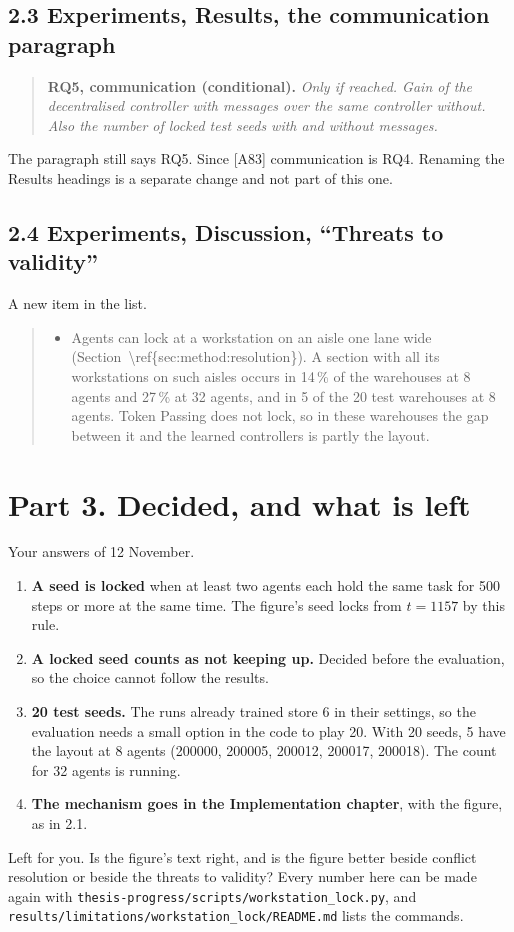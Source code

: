 \documentclass[11pt,a4paper]{article}
\newcommand{\new}[1]{\textcolor{newc}{#1}}
\newcommand{\mockup}[1]{\textit{#1}}
\begin{document}
\subsection*{2.3 Experiments, Results, the communication paragraph}
\begin{quote}
\textbf{RQ5, communication (conditional).} \mockup{Only if reached. Gain of
the decentralised controller with messages over the same controller without.}
\new{\mockup{Also the number of locked test seeds with and without
messages.}}
\end{quote}
The paragraph still says RQ5. Since [A83] communication is RQ4. Renaming the
Results headings is a separate change and not part of this one.

\subsection*{2.4 Experiments, Discussion, ``Threats to validity''}
A new item in the list.
\begin{quote}
\begin{itemize}[leftmargin=1.2em]
\item \new{Agents can lock at a workstation on an aisle one lane wide
(Section~\textbackslash ref\{sec:method:resolution\}). A section with all its workstations on such aisles occurs in
14\,\% of the warehouses at 8 agents and 27\,\% at 32 agents, and in 5 of the
20 test warehouses at 8 agents. Token Passing
does not lock, so in these warehouses the gap between it and the learned
controllers is partly the layout.}
\end{itemize}
\end{quote}

\section*{Part 3. Decided, and what is left}
Your answers of 12 November.
\begin{enumerate}[leftmargin=1.4em]
\item \textbf{A seed is locked} when at least two agents each hold the same
task for 500 steps or more at the same time. The figure's seed locks from
$t = 1157$ by this rule.
\item \textbf{A locked seed counts as not keeping up.} Decided before the
evaluation, so the choice cannot follow the results.
\item \textbf{20 test seeds.} The runs already trained store 6 in their
settings, so the evaluation needs a small option in the code to play 20.
With 20 seeds, 5 have the layout at 8 agents (200000, 200005, 200012,
200017, 200018). The count for 32 agents is running.
\item \textbf{The mechanism goes in the Implementation chapter}, with the
figure, as in 2.1.
\end{enumerate}

Left for you. Is the figure's text right, and is the figure better beside
conflict resolution or beside the threats to validity? Every number here can
be made again with \texttt{thesis-progress/scripts/workstation\_lock.py}, and
\texttt{results/limitations/workstation\_lock/README.md} lists the commands.
\end{document}
